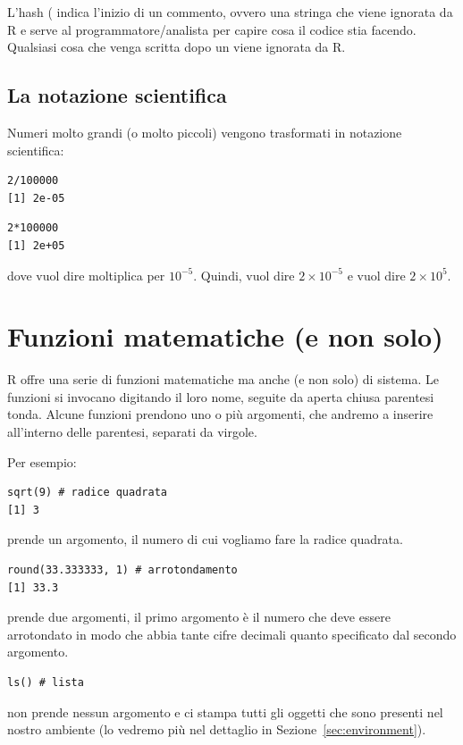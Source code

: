 L'hash (\lsin{#} indica l'inizio di un commento, ovvero una stringa che viene ignorata da R e serve al programmatore/analista per capire cosa il codice stia facendo. Qualsiasi cosa che venga scritta dopo un \lsin{#} viene ignorata da R.

\subsection{La notazione scientifica}

Numeri molto grandi (o molto piccoli) vengono trasformati in notazione scientifica:

\begin{lstlisting}[style=Rstyle]
2/100000
[1] 2e-05
\end{lstlisting}

\begin{lstlisting}[style=Rstyle]
2*100000
[1] 2e+05
\end{lstlisting}
%
dove  vuol dire moltiplica per $10^{-5}$. Quindi,  vuol dire $2 \times 10^{-5}$ e   vuol dire $2 \times 10^{5}$.



\section{Funzioni matematiche (e non solo)}
\label{sec:Rfunctions}

R offre una serie di funzioni matematiche ma anche (e non solo) di sistema. Le funzioni si invocano digitando il loro nome, seguite da aperta chiusa parentesi tonda. Alcune funzioni prendono uno o pi\`u argomenti, che andremo a inserire all'interno delle parentesi, separati da virgole.


\noindent Per esempio:

\begin{lstlisting}[style=Rstyle]
sqrt(9) # radice quadrata
[1] 3
\end{lstlisting}
%
prende un argomento, il numero di cui vogliamo fare la radice quadrata.

\begin{lstlisting}[style=Rstyle]
round(33.333333, 1) # arrotondamento
[1] 33.3
\end{lstlisting}
%
prende due argomenti, il primo argomento \`e il numero che deve essere arrotondato in modo che abbia tante cifre decimali quanto specificato dal secondo argomento.

\begin{lstlisting}[style=Rstyle]
ls() # lista
\end{lstlisting}
%
non prende nessun argomento e ci stampa tutti gli oggetti che sono presenti nel nostro ambiente (lo vedremo pi\`u nel dettaglio in Sezione~\ref{sec:environment}).

